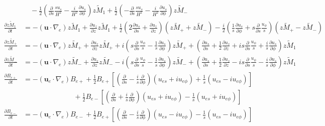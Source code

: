 \begin{align*}
    &\quad -\frac{1}{2} \left(\frac{\partial}{\partial s} \frac{su_s}{H^2} - \frac{i}{H^2} \frac{\partial u_s}{\partial \phi}\right) \widetilde{zM_1} + \frac{1}{2} \left(-\frac{\partial}{\partial s}\frac{su_s}{H^2} - \frac{i}{H^2}\frac{\partial u_s}{\partial \phi}\right) \widetilde{zM_-} \\
    \frac{\partial \widetilde{zM_1}}{\partial t} &= -(\mathbf{u}\cdot \nabla_e) \widetilde{zM_1} + \frac{\partial u_z}{\partial z} \widetilde{zM_1} + \frac{1}{2} \left(2\frac{\partial u_s}{\partial s} + \frac{\partial u_z}{\partial z}\right) \left(\widetilde{zM_+} + \widetilde{zM_-}\right) - \frac{i}{2}\left(\frac{1}{s}\frac{\partial u_s}{\partial \phi} + s \frac{\partial}{\partial s}\frac{u_\phi}{s}\right) \left(\widetilde{zM_+} - \widetilde{zM_-}\right) \\
    \frac{\partial \widetilde{zM_+}}{\partial t} &= - (\mathbf{u}\cdot \nabla_e) \widetilde{zM_+} + \frac{\partial u_z}{\partial z} \widetilde{zM_+} + i \left(s\frac{\partial}{\partial s}\frac{u_\phi}{s} - \frac{1}{s}\frac{\partial u_s}{\partial \phi}\right) \widetilde{zM_+} + \left(\frac{\partial u_s}{\partial s} + \frac{1}{2}\frac{\partial u_z}{\partial z} + is \frac{\partial}{\partial s}\frac{u_\phi}{s}+ \frac{i}{s}\frac{\partial u_s}{\partial \phi}\right) \widetilde{zM_1} \\
    \frac{\partial \widetilde{zM_-}}{\partial t} &= - (\mathbf{u}\cdot \nabla_e) \widetilde{zM_-} + \frac{\partial u_z}{\partial z} \widetilde{zM_-} - i \left(s\frac{\partial}{\partial s}\frac{u_\phi}{s} - \frac{1}{s}\frac{\partial u_s}{\partial \phi}\right) \widetilde{zM_-} + \left(\frac{\partial u_s}{\partial s} + \frac{1}{2}\frac{\partial u_z}{\partial z} - is \frac{\partial}{\partial s}\frac{u_\phi}{s}- \frac{i}{s}\frac{\partial u_s}{\partial \phi}\right) \widetilde{zM_1} \\
    \frac{\partial B_{e+}}{\partial t} &= - \left(\mathbf{u}_e \cdot \nabla_e\right) B_{e+} + \frac{1}{2} B_{e+} \left[\left(\frac{\partial}{\partial s} - \frac{i}{s}\frac{\partial}{\partial \phi}\right) \left(u_{es} + iu_{e\phi}\right) + \frac{1}{s} \left(u_{es} - i u_{e\phi}\right)\right] \\ 
    &\qquad \qquad \qquad \quad \, + \frac{1}{2} B_{e-} \left[\left(\frac{\partial}{\partial s} + \frac{i}{s}\frac{\partial}{\partial \phi}\right) \left(u_{es} + iu_{e\phi}\right) - \frac{1}{s} \left(u_{es} + i u_{e\phi}\right)\right] \\ 
    \frac{\partial B_{e-}}{\partial t} &= - \left(\mathbf{u}_e \cdot \nabla_e\right) B_{e-} + \frac{1}{2} B_{e+} \left[\left(\frac{\partial}{\partial s} - \frac{i}{s}\frac{\partial}{\partial \phi}\right) \left(u_{es} - iu_{e\phi}\right) - \frac{1}{s} \left(u_{es} - i u_{e\phi}\right)\right] \\ 

\end{align*}
